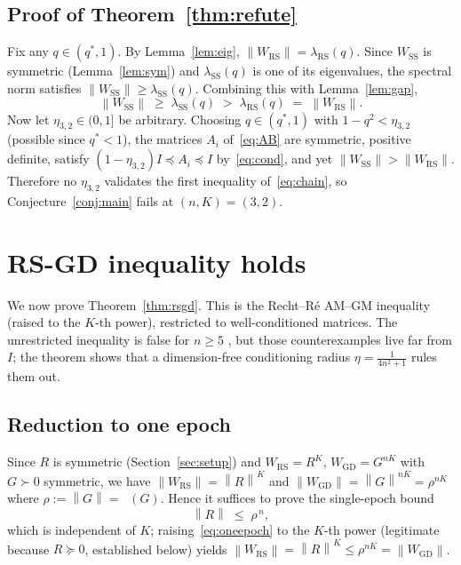 \documentclass[11pt]{article}
\theoremstyle{definition}
\theoremstyle{remark}
\newcommand{\norm}[1]{\left\lVert #1 \right\rVert}
\newcommand{\Wss}{W_{\mathrm{SS}}}
\newcommand{\Wrs}{W_{\mathrm{RS}}}
\newcommand{\Wgd}{W_{\mathrm{GD}}}
\DeclareMathOperator*{\lammax}{\lambda_{\max}}
\newcommand{\psdle}{\preceq}
\newcommand{\psdge}{\succeq}
\begin{document}
\subsection{Proof of Theorem~\ref{thm:refute}}

Fix any $q\in(q^\ast,1)$. By Lemma~\ref{lem:eig}, $\norm{\Wrs}=\lambda_{\mathrm{RS}}(q)$.
Since $\Wss$ is symmetric (Lemma~\ref{lem:sym}) and $\lambda_{\mathrm{SS}}(q)$ is one of its eigenvalues, the spectral norm
satisfies $\norm{\Wss}\ge\lambda_{\mathrm{SS}}(q)$. Combining this with Lemma~\ref{lem:gap},
\[
\norm{\Wss}\;\ge\;\lambda_{\mathrm{SS}}(q)\;>\;\lambda_{\mathrm{RS}}(q)\;=\;\norm{\Wrs}.
\]
Now let $\eta_{3,2}\in(0,1]$ be arbitrary. Choosing $q\in(q^\ast,1)$ with
$1-q^2<\eta_{3,2}$ (possible since $q^\ast<1$), the matrices $A_i$ of~\eqref{eq:AB} are symmetric,
positive definite, satisfy $(1-\eta_{3,2})I\psdle A_i\psdle I$ by~\eqref{eq:cond}, and yet
$\norm{\Wss}>\norm{\Wrs}$. Therefore no $\eta_{3,2}$ validates the first inequality
of~\eqref{eq:chain}, so Conjecture~\ref{conj:main} fails at $(n,K)=(3,2)$. 



\section{RS-GD inequality holds}\label{sec:rsgd}

We now prove Theorem~\ref{thm:rsgd}. This is the Recht--R\'e AM--GM inequality \cite{RechtRe12} (raised to the
$K$-th power), restricted to well-conditioned matrices. The unrestricted inequality is false for
$n\ge5$ \cite{LaiLim20,DeSa20}, but those counterexamples live far from $I$; the theorem shows that a
dimension-free conditioning radius $\eta=\frac1{4n^2+1}$ rules them out.


\subsection{Reduction to one epoch}

Since $R$ is symmetric (Section~\ref{sec:setup}) and $\Wrs=R^K$, $\Wgd=G^{nK}$ with $G\succ0$
symmetric, we have $\norm{\Wrs}=\norm{R}^K$ and $\norm{\Wgd}=\norm{G}^{nK}=\rho^{nK}$ where
$\rho:=\norm{G}=\lammax(G)$. Hence it suffices to prove the single-epoch bound
\begin{equation}\label{eq:oneepoch}
\norm{R}\;\le\;\rho^{\,n},
\end{equation}
which is independent of $K$; raising~\eqref{eq:oneepoch} to the $K$-th power (legitimate because
$R\psdge0$, established below) yields $\norm{\Wrs}=\norm{R}^K\le\rho^{nK}=\norm{\Wgd}$.
\end{document}
